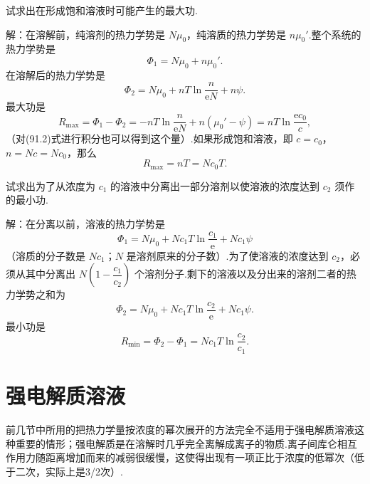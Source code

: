 \begin{xiti}

\quad 试求出在形成饱和溶液时可能产生的最大功.

解：在溶解前，纯溶剂的热力学势是 $N\mu_0$，纯溶质的热力学势是 $n\mu_0'$.整个系统的热力学势是
\begin{equation*}
  \varPhi_1=N\mu_0+n\mu_0'.
\end{equation*}
在溶解后的热力学势是
\begin{equation*}
  \varPhi_2=N\mu_0+nT\ln\frac{n}{\mathrm{e}N}+n\psi.
\end{equation*}
最大功是
\begin{equation*}
  R_{\max}=\varPhi_1-\varPhi_2
  =-nT\ln\frac{n}{\mathrm{e}N}+n(\mu_0'-\psi)
  =nT\ln\frac{\mathrm{e}c_0}{c},
\end{equation*}
（对(91.2)式进行积分也可以得到这个量）.如果形成饱和溶液，即 $c=c_0$，$n=Nc=Nc_0$，那么
\begin{equation*}
  R_{\max}=nT=Nc_0T.
\end{equation*}

\quad 试求出为了从浓度为 $c_1$ 的溶液中分离出一部分溶剂以使溶液的浓度达到 $c_2$ 须作的最小功.

解：在分离以前，溶液的热力学势是
\begin{equation*}
  \varPhi_1=N\mu_0+Nc_1T\ln\frac{c_1}{\mathrm{e}}+Nc_1\psi
\end{equation*}
（溶质的分子数是 $Nc_1$；$N$ 是溶剂原来的分子数）.为了使溶液的浓度达到 $c_2$，必须从其中分离出 $N\left(1-\dfrac{c_1}{c_2}\right)$ 个溶剂分子.剩下的溶液以及分出来的溶剂二者的热力学势之和为
\begin{equation*}
  \varPhi_2=N\mu_0+Nc_1T\ln\frac{c_2}{\mathrm{e}}+Nc_1\psi.
\end{equation*}
最小功是
\begin{equation*}
  R_{\min}=\varPhi_2-\varPhi_1=Nc_1T\ln\frac{c_2}{c_1}.
\end{equation*}

\end{xiti}

\section{强电解质溶液}

前几节中所用的把热力学量按浓度的幂次展开的方法完全不适用于强电解质溶液这种重要的情形；强电解质是在溶解时几乎完全离解成离子的物质.离子间库仑相互作用力随距离增加而来的减弱很缓慢，这使得出现有一项正比于浓度的低幂次（低于二次，实际上是3/2次）.

